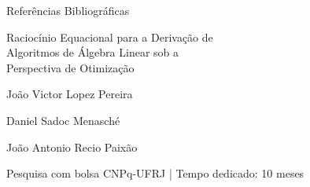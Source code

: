 
\begin{frame}{Referências Bibliográficas}
  \nocite{*}
  \printbibliography[heading=none]
\end{frame}


\begin{frame}[plain]
  \centering
  \vspace{1cm}
  {\LARGE Raciocínio Equacional para a Derivação de \\ Algoritmos de Álgebra Linear sob a \\ Perspectiva de Otimização \par}
  \vspace{1cm}
  {\large João Victor Lopez Pereira \par}
  \vspace{0.5cm}
  {\large Daniel Sadoc Menasché \par}
  \vspace{0.5cm}
  {\large João Antonio Recio Paixão \par}
  \vfill
  {\footnotesize Pesquisa com bolsa CNPq-UFRJ \quad | \quad Tempo dedicado: 10 meses \par}
  \vfill
\end{frame}
